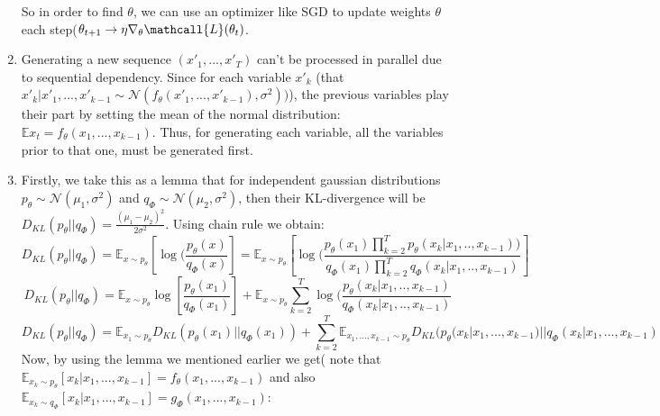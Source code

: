 \documentclass{article}
\begin{document}
\begin{enumerate}
\begin{equation*}
    \end{equation*}
    So in order to find $\theta$, we can use an optimizer like SGD to update weights $\theta$ each step($\theta_{t+1} \rightarrow \eta \nabla_\theta \mathcall{L}(\theta_t) $.
    \item  Generating a new sequence $(x'_1, ..., x'_T)$ can't be processed in parallel due to sequential dependency. Since for each variable $x'_k$ (that  $ x'_k | x'_1 , ..., x'_{k-1} \sim \mathcal{N}(f_\theta(x'_1,...,x'_{k-1}) , \sigma^2))$), the previous variables play their part by setting the mean of the normal distribution: $\mathbb{E} x_t = f_\theta(x_1,...,x_{k-1})$. Thus, for generating each variable, all the variables prior to that one, must be generated first.
    \item Firstly, we take this as a lemma that for independent gaussian distributions $p_\theta \sim  \mathcal{N}(\mu_1, \sigma^2)$ and $q_\Phi \sim  \mathcal{N}(\mu_2, \sigma^2)$, then their KL-divergence will be $D_{KL}(p_\theta || q_\Phi) = \frac{(\mu_1 - \mu_2)^2}{2 \sigma^2} $.
    Using chain rule we obtain:
    \begin{equation*}
        D_{KL}(p_\theta || q_\Phi) = \mathbb{E}_{x \sim p_\theta}
        [\log (\frac{p_\theta(x)}{q_\Phi(x)}] = \mathbb{E}_{x \sim p_\theta} 
        [\log (\frac{p_\theta(x_1) \prod_{k=2}^T p_\theta(x_k|x_1,..,x_{k-1} ) ) }{q_\Phi(x_1) \prod_{k=2}^T q_\Phi(x_k|x_1,..,x_{k-1} )}]
    \end{equation*}
    \begin{equation*}
        D_{KL}(p_\theta || q_\Phi) = \mathbb{E}_{x \sim p_\theta} 
        \log[\frac{p_\theta(x_1)}{q_\Phi(x_1)}] + \mathbb{E}_{x \sim p_\theta} \sum_{k=2}^T \log(\frac{p_\theta(x_k|x_1,..,x_{k-1} )}{q_\Phi(x_k|x_1,..,x_{k-1} )}
    \end{equation*}
    \begin{equation*}
        D_{KL}(p_\theta || q_\Phi)=
        \mathbb{E}_{x_1 \sim p_\theta}  D_{KL} (p_\theta(x_1) || q_\Phi(x_1)) + 
        \sum_{k=2}^T \mathbb{E}_{x_1,...,x_{k-1}  \sim p_\theta} 
        D_{KL} (p_\theta(x_k| x_1,...,x_{k-1}) || q_\Phi(x_k| x_1,...,x_{k-1})
    \end{equation*}
    Now, by using the lemma we mentioned earlier we get( note that 
    $\mathbb{E}_{x_k \sim p_\theta} [x_k | x_1,...,x_{k-1}] = f_\theta(x_1,...,x_{k-1})$ and also $\mathbb{E}_{x_k \sim q_\Phi} [x_k | x_1,...,x_{k-1}] = g_\Phi(x_1,...,x_{k-1})$:

\end{enumerate}
\end{document}

